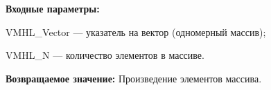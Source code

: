 \textbf{Входные параметры:}

 VMHL\_Vector --- указатель на вектор (одномерный массив);
 
 VMHL\_N --- количество элементов в массиве.

\textbf{Возвращаемое значение:}
 Произведение элементов массива.